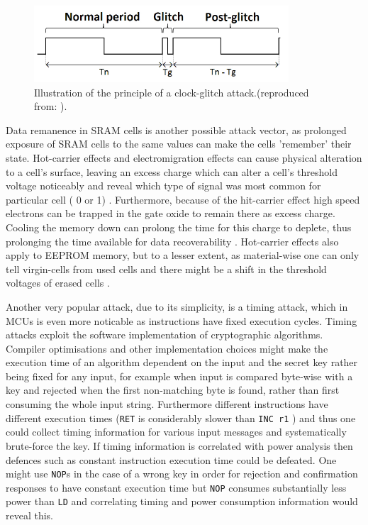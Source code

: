	\begin{figure}
		\center
		\includegraphics[scale=0.7]{img/clock_glitch.png}
		\caption{\footnotesize Illustration of the principle of a clock-glitch attack.(reproduced from: \protect\citep{glitches_paper}).}
		\label{fig:glitch}		
	\end{figure}

	Data remanence in SRAM cells is another possible attack vector, as prolonged exposure of SRAM cells to the same values can make the cells 'remember' their state. Hot-carrier effects and electromigration effects can cause physical alteration to a cell's surface, leaving an excess charge which can alter a cell's threshold voltage noticeably and reveal which type of signal was most common for particular cell ( 0 or 1) \citep{gutman:memory_remanence}. Furthermore, because of the hit-carrier effect high speed electrons can be trapped in the gate oxide to remain there as excess charge. Cooling the memory down can prolong the time for this charge to deplete, thus prolonging the time available for data recoverability  \citep{gutman:memory_remanence} \citep{sergei:RAM} \citep{sergei:thesis}. Hot-carrier effects also apply to EEPROM memory, but to a lesser extent, as material-wise one can only tell virgin-cells from used cells and there might be a shift in the threshold voltages of erased cells\citep{gutman:memory_remanence} \citep{sergei:thesis}. 
	
	
	Another very popular attack, due to its simplicity, is a timing attack, which in MCUs is even more noticable as instructions have fixed execution cycles. Timing attacks exploit the software implementation of cryptographic algorithms. Compiler optimisations and other implementation choices might make the execution time of an algorithm dependent on the input and the secret key rather being fixed for any input, for example when input is compared byte-wise with a key and rejected when the first non-matching byte is found, rather than first consuming the whole input string. Furthermore different instructions have different execution times (\texttt{RET} is considerably slower than \texttt{INC r1} \citep{atmega_manual}) and thus one could collect timing information for various input messages and systematically brute-force the key. If timing information is correlated with power analysis then defences such as constant instruction execution time could be defeated. One might use \texttt{NOP}s in the case of a wrong key in order for rejection and confirmation responses to have constant execution time but \texttt{NOP} consumes substantially less power than \texttt{LD} \citep{glitches_paper} and correlating timing and power consumption information would reveal this.


